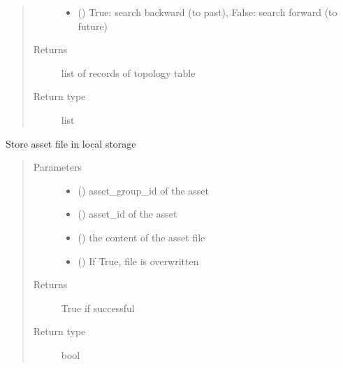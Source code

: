 \documentclass[letterpaper,10pt,english]{sphinxmanual}
\begin{document}
\begin{fulllineitems}
\begin{fulllineitems}
\begin{quote}
\begin{description}
\begin{itemize}
\item {} 
 () \textendash{} True: search backward (to past), False: search forward (to future)

\end{itemize}

\item[{Returns}] \leavevmode
list of records of topology table

\item[{Return type}] \leavevmode
list

\end{description}\end{quote}

\end{fulllineitems}


\begin{fulllineitems}
\label{\detokenize{bbc1.core.data_handler:bbc1.core.data_handler.DataHandlerDomain0.store_in_storage}}
Store asset file in local storage
\begin{quote}\begin{description}
\item[{Parameters}] \leavevmode\begin{itemize}
\item {} 
 () \textendash{} asset\_group\_id of the asset

\item {} 
 () \textendash{} asset\_id of the asset

\item {} 
 () \textendash{} the content of the asset file

\item {} 
 () \textendash{} If True, file is overwritten

\end{itemize}

\item[{Returns}] \leavevmode
True if successful

\item[{Return type}] \leavevmode
bool

\end{description}\end{quote}

\end{fulllineitems}


\end{fulllineitems}
\end{document}
